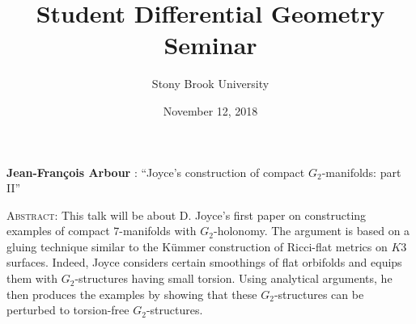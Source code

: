 \documentclass[11pt]{article}
\title{Student Differential Geometry Seminar}
\author{Stony Brook University}
\date{November 12, 2018}
\makeatletter
\newcommand{\spe@ker}{}
\newcommand{\t@lktitle}{}
\newcommand{\@ffili@tion}{}
\newcommand{\speaker}[1]{%
  \renewcommand{\spe@ker}{#1}}
\newcommand{\talktitle}[1]{%
  \renewcommand{\t@lktitle}{#1}}
\newcommand{\affiliation}[1]{%
  \renewcommand{\@ffili@tion}{#1}}
\renewenvironment{abstract}{%
  \begin{center}
    \large
    \textbf{\spe@ker} %
    : ``\t@lktitle''
  \end{center}
  \begin{trivlist}
  \item\textsc{Abstract:}}{%
  \end{trivlist}}
\makeatother
\begin{document}
\maketitle
\thispagestyle{empty}

\speaker{Jean-Fran\c{c}ois Arbour}
\talktitle{Joyce's construction of compact $G_2$-manifolds: part II}

\begin{abstract}
 This talk will be about D. Joyce's first paper on constructing examples of compact $7$-manifolds with $G_2$-holonomy. The argument is based on a gluing technique similar to the K\"ummer construction of Ricci-flat metrics on $K3$ surfaces. Indeed, Joyce considers certain smoothings of flat orbifolds and equips them with $G_2$-structures having small torsion. Using analytical arguments, he then produces the examples by showing that these $G_2$-structures can be perturbed to torsion-free $G_2$-structures.
\end{abstract}
\end{document}
